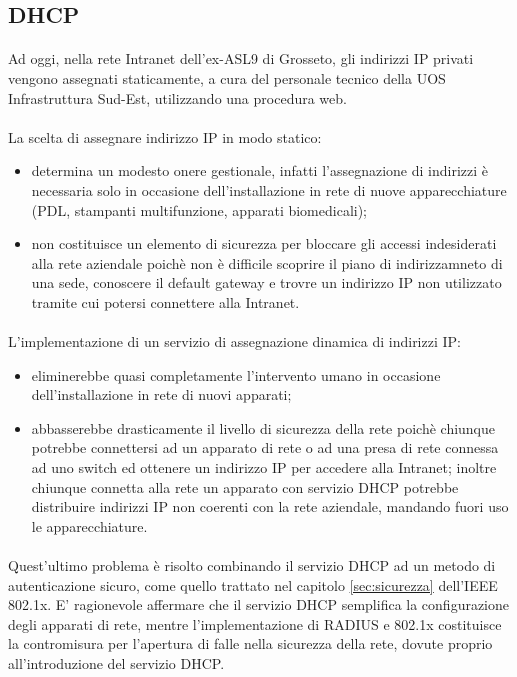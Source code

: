\subsection{DHCP}
\paragraph{} Ad oggi, nella rete Intranet dell'ex-ASL9 di Grosseto, gli indirizzi IP privati vengono assegnati staticamente, a cura del personale tecnico della UOS Infrastruttura Sud-Est, utilizzando una procedura web. 
\paragraph{} La scelta di assegnare indirizzo IP in modo statico:
\begin{itemize}
    \item determina un modesto onere gestionale, infatti l'assegnazione di indirizzi è necessaria solo in occasione dell'installazione in rete di nuove apparecchiature (PDL, stampanti multifunzione, apparati biomedicali);
    \item non costituisce un elemento di sicurezza per bloccare gli accessi indesiderati alla rete aziendale poichè non è difficile scoprire il piano di indirizzamneto di una sede, conoscere il default gateway e trovre un indirizzo IP non utilizzato tramite cui potersi connettere alla Intranet. 
\end{itemize} 
\paragraph{} L'implementazione di un servizio di assegnazione dinamica di indirizzi IP: 
\begin{itemize}
    \item eliminerebbe quasi completamente l'intervento umano in occasione dell'installazione in rete di nuovi apparati;
    \item abbasserebbe drasticamente il livello di sicurezza della rete poichè chiunque potrebbe connettersi ad un apparato di rete o ad una presa di rete connessa ad uno switch ed ottenere un indirizzo IP per accedere alla Intranet; inoltre chiunque connetta alla rete un apparato con servizio DHCP potrebbe distribuire indirizzi IP non coerenti con la rete aziendale, mandando fuori uso le apparecchiature.
 \end{itemize}
\paragraph{} Quest'ultimo problema è risolto combinando il servizio DHCP ad un metodo di autenticazione sicuro, come quello trattato nel capitolo \ref{sec:sicurezza} dell'IEEE 802.1x. E' ragionevole affermare che il servizio DHCP semplifica la configurazione degli apparati di rete, mentre l'implementazione di RADIUS e 802.1x costituisce la contromisura per l'apertura di falle nella sicurezza della rete, dovute proprio all'introduzione del servizio DHCP.

